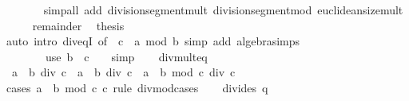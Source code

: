 \begin{isabellebody}
\ \ \ \ \ \ \isamarkupfalse%
\ {\isacharparenleft}{\kern0pt}simp{\isacharunderscore}{\kern0pt}all\ add{\isacharcolon}{\kern0pt}\ division{\isacharunderscore}{\kern0pt}segment{\isacharunderscore}{\kern0pt}mult\ division{\isacharunderscore}{\kern0pt}segment{\isacharunderscore}{\kern0pt}mod\ euclidean{\isacharunderscore}{\kern0pt}size{\isacharunderscore}{\kern0pt}mult{\isacharparenright}{\kern0pt}\isanewline
\ \ \ \ \isamarkupfalse%
\ remainder\ \isamarkupfalse%
\ {\isacharquery}{\kern0pt}thesis\isanewline
\ \ \ \ \ \ \isamarkupfalse%
\ {\isacharparenleft}{\kern0pt}auto\ intro{\isacharbang}{\kern0pt}{\isacharcolon}{\kern0pt}\ div{\isacharunderscore}{\kern0pt}eqI\ {\isacharbrackleft}{\kern0pt}of\ {\isacharunderscore}{\kern0pt}\ {\isachardoublequoteopen}c\ {\isacharasterisk}{\kern0pt}\ {\isacharparenleft}{\kern0pt}a\ mod\ b{\isacharparenright}{\kern0pt}{\isachardoublequoteclose}{\isacharbrackright}{\kern0pt}\ simp\ add{\isacharcolon}{\kern0pt}\ algebra{\isacharunderscore}{\kern0pt}simps{\isacharparenright}{\kern0pt}\isanewline
\ \ \ \ \ \ \ \ {\isacharparenleft}{\kern0pt}use\ {\isacartoucheopen}b\ {\isacharasterisk}{\kern0pt}\ c\ {\isasymnoteq}\ {}{\isacartoucheclose}\ \ simp{\isacharparenright}{\kern0pt}\isanewline
\ \ \isamarkupfalse%
\isanewline
{}\isamarkupfalse%
%
\endisatagproof
{\isafoldproof}%
%
\isadelimproof
\isanewline
%
\endisadelimproof
\isanewline
{}\isamarkupfalse%
\ div{\isacharunderscore}{\kern0pt}mult{}{\isacharunderscore}{\kern0pt}eq{\isacharcolon}{\kern0pt}\isanewline
\ \ {\isachardoublequoteopen}{\isacharparenleft}{\kern0pt}a\ {\isacharasterisk}{\kern0pt}\ b{\isacharparenright}{\kern0pt}\ div\ c\ {\isacharequal}{\kern0pt}\ a\ {\isacharasterisk}{\kern0pt}\ {\isacharparenleft}{\kern0pt}b\ div\ c{\isacharparenright}{\kern0pt}\ {\isacharplus}{\kern0pt}\ a\ {\isacharasterisk}{\kern0pt}\ {\isacharparenleft}{\kern0pt}b\ mod\ c{\isacharparenright}{\kern0pt}\ div\ c{\isachardoublequoteclose}\isanewline
%
\isadelimproof
%
\endisadelimproof
%
\isatagproof
{}\isamarkupfalse%
\ {\isacharparenleft}{\kern0pt}cases\ {\isachardoublequoteopen}a\ {\isacharasterisk}{\kern0pt}\ {\isacharparenleft}{\kern0pt}b\ mod\ c{\isacharparenright}{\kern0pt}{\isachardoublequoteclose}\ c\ rule{\isacharcolon}{\kern0pt}\ divmod{\isacharunderscore}{\kern0pt}cases{\isacharparenright}{\kern0pt}\isanewline
\ \ \isamarkupfalse%
\ {\isacharparenleft}{\kern0pt}divides\ q{\isacharparenright}{\kern0pt}\isanewline

\end{isabellebody}
